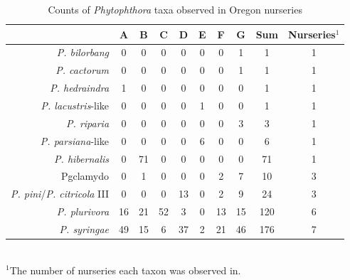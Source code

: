 \documentclass[12pt]{article}
\begin{document}
\begin{table}[ht]
\centering
\caption{Counts of \emph{Phytophthora} taxa observed in Oregon nurseries} 
\label{tab:taxa_counts}
\begin{tabular}{rccccccccc}
  \hline
 & \textbf{A} & \textbf{B} & \textbf{C} & \textbf{D} & \textbf{E} & \textbf{F} & \textbf{G} & \textbf{Sum} & \textbf{Nurseries}$^{1}$ \\ 
  \hline
  \emph{P. bilorbang} & 0 & 0 & 0 & 0 & 0 & 0 & 1 & 1 & 1 \\ 
  \emph{P. cactorum} & 0 & 0 & 0 & 0 & 0 & 0 & 1 & 1 & 1 \\ 
  \emph{P. hedraindra}  & 1 & 0 & 0 & 0 & 0 & 0 & 0 & 1 & 1 \\ 
  \emph{P. lacustris}-like & 0 & 0 & 0 & 0 & 1 & 0 & 0 & 1 & 1 \\ 
  \emph{P. riparia} & 0 & 0 & 0 & 0 & 0 & 0 & 3 & 3 & 1 \\ 
  \emph{P. parsiana}-like & 0 & 0 & 0 & 0 & 6 & 0 & 0 & 6 & 1 \\ 
  \emph{P. hibernalis} & 0 & 71 & 0 & 0 & 0 & 0 & 0 & 71 & 1 \\ 
  Pgclamydo & 0 & 1 & 0 & 0 & 0 & 2 & 7 & 10 & 3 \\ 
  \emph{P. pini}/\emph{P. citricola} III & 0 & 0 & 0 & 13 & 0 & 2 & 9 & 24 & 3 \\ 
  \emph{P. plurivora} & 16 & 21 & 52 & 3 & 0 & 13 & 15 & 120 & 6 \\ 
  \emph{P. syringae} & 49 & 15 & 6 & 37 & 2 & 21 & 46 & 176 & 7 \\ 
   \hline
\end{tabular}
\\
$^{1}$The number of nurseries each taxon was observed in.
\end{table}
\end{document}
